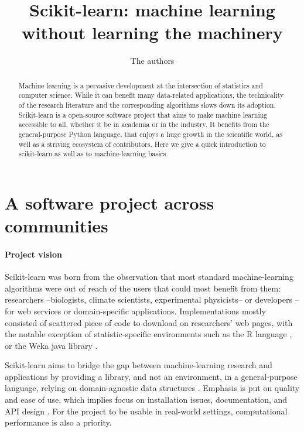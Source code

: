 \documentclass[a4paper]{article}
\title{Scikit-learn: machine learning without learning the machinery}
\author{The authors}
\begin{document}
\lstset{language=Python}

\maketitle

\begin{abstract}
Machine learning is a pervasive development at the intersection of
statistics and computer science. While it can benefit many
data-related applications, the technicality of the research literature
and the corresponding algorithms slows down its adoption. Scikit-learn is
a open-source software project that aims to make machine learning
accessible to all, whether it be in academia or in the industry. It
benefits from 
the general-purpose Python language, that enjoys a huge growth in
the scientific world, as well as a striving ecosystem of contributors.
Here we give a quick introduction to scikit-learn as well as to
machine-learning basics.
\end{abstract}

\section{A software project across communities}

\paragraph{Project vision}
%
Scikit-learn was born from the observation that most standard
machine-learning algorithms were out of reach of the users that could
most benefit from them: researchers --biologists, climate
scientists, experimental physicists-- or developers --for web
services or domain-specific applications.
%
Implementations mostly consisted of scattered piece of code to download
on researchers' web pages, with the notable exception of
statistic-specific environments such as the R language \cite{Rmanual}, or
the Weka java library \cite{hall2009weka}.

Scikit-learn aims to bridge the gap between machine-learning research and
applications by providing a library, and not an environment, in a
general-purpose language, relying on domain-agnostic data structures
\cite{pedregosa2011}. Emphasis is put on quality and ease of use, which
implies focus on installation issues, documentation, and API design
\cite{buitinck2013ecml}. For the project to be usable in real-world
settings, computational performance is also a priority.
\end{document}
